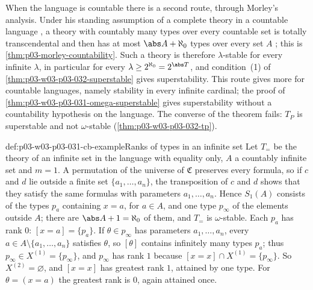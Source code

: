 When the language is countable there is a second route, through Morley's
analysis.  Under his standing assumption of a complete theory in a
countable language \cite[\S~2, p.~518]{Morley1965}, a theory with
countably many types over every countable set is totally transcendental
and then has at most \(\abs A+\aleph_0\) types over every set \(A\)
\cite[Theorems~2.7 and~2.8, p.~522]{Morley1965}; this is
\cref{thm:p03-morley-countability}.  Such a theory is therefore
\(\lambda\)-stable for every infinite \(\lambda\), in particular for every
\(\lambda\geq2^{\aleph_0}=2^{\abs T}\), and condition~(1) of
\cref{thm:p03-w03-p03-032-superstable} gives superstability.  This route
gives more for countable languages, namely stability in every infinite
cardinal; the proof of \cref{thm:p03-w03-p03-031-omega-superstable} gives
superstability without a countability hypothesis on the language.  The
converse of the theorem fails: \(T_P\) is superstable and not
\(\omega\)-stable (\cref{thm:p03-w03-p03-032-tp}).

\begin{hbexample}{def:p03-w03-p03-031-cb-example}{Ranks of types in an infinite set}
Let \(T_=\) be the theory of an infinite set in the language with equality
only, \(A\) a countably infinite set and \(m=1\).  A permutation of the
universe of \(\mathfrak C\) preserves every formula, so if \(c\) and \(d\)
lie outside a finite set \(\{a_1,\ldots,a_n\}\), the transposition of
\(c\) and \(d\) shows that they satisfy the same formulas with parameters
\(a_1,\ldots,a_n\).  Hence \(S_1(A)\) consists of the types \(p_a\)
containing \(x=a\), for \(a\in A\), and one type \(p_\infty\) of the
elements outside \(A\); there are \(\abs A+1=\aleph_0\) of them, and
\(T_=\) is \(\omega\)-stable.  Each \(p_a\) has rank \(0\):
\([x=a]=\{p_a\}\).  If \(\theta\in p_\infty\) has parameters
\(a_1,\ldots,a_n\), every \(a\in A\setminus\{a_1,\ldots,a_n\}\) satisfies
\(\theta\), so \([\theta]\) contains infinitely many types \(p_a\); thus
\(p_\infty\in X^{(1)}=\{p_\infty\}\), and \(p_\infty\) has rank \(1\) because
\([x=x]\cap X^{(1)}=\{p_\infty\}\).  So \(X^{(2)}=\varnothing\), and
\([x=x]\) has greatest rank \(1\), attained by one type.  For
\(\theta=(x=a)\) the greatest rank is \(0\), again attained once.
\end{hbexample}

